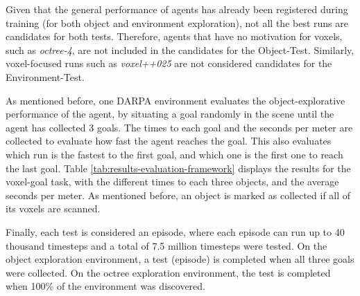\newpage

Given that the general performance of agents has already been registered during training (for both object and environment exploration), not all the best runs are candidates for both tests. 
Therefore, agents that have no motivation for voxels, such as \textit{octree-4}, are not included in the candidates for the {Object-Test}. Similarly, voxel-focused runs such as \textit{voxel++025} are not considered candidates for the Environment-Test.

As mentioned before, one DARPA environment evaluates the object-explorative performance of the agent, by situating a goal randomly in the scene until the agent has collected 3 goals. The times to each goal and the seconds per meter are collected to evaluate how fast the agent reaches the goal. This also evaluates which run is the fastest to the first goal, and which one is the first one to reach the last goal. 
Table \ref{tab:results-evaluation-framework} displays the results for the voxel-goal task, with the different times to each three objects, and the average seconds per meter. As mentioned before, an object is marked as collected if all of its voxels are scanned.

Finally, each test is considered an episode, where each episode can run up to 40 thousand timesteps and a total of 7.5 million timesteps were tested. On the object exploration environment, a test (episode) is completed when all three goals were collected. On the octree exploration environment, the test is completed when 100\% of the environment was discovered.


